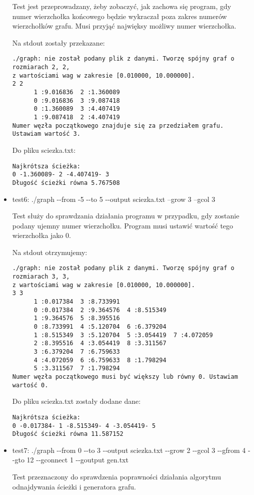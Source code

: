 \documentclass[]{article}
\begin{document}
\begin{itemize}
Test jest przeprowadzany, żeby zobaczyć, jak zachowa się program, gdy numer wierzchołka końcowego będzie wykraczał poza zakres numerów wierzchołków grafu. Musi przyjąć najwięksy możliwy numer wierzchołka.

Na stdout zostały przekazane:
\begin{verbatim}
./graph: nie został podany plik z danymi. Tworzę spójny graf o rozmiarach 2, 2, 
z wartościami wag w zakresie [0.010000, 10.000000].
2 2
	  1 :9.016836  2 :1.360089
	  0 :9.016836  3 :9.087418
	  0 :1.360089  3 :4.407419
	  1 :9.087418  2 :4.407419
Numer węzła początkowego znajduje się za przedziałem grafu. Ustawiam wartość 3.
\end{verbatim}

Do pliku sciezka.txt:
\begin{verbatim}
Najkrótsza ścieżka: 
0 -1.360089- 2 -4.407419- 3
Długość ścieżki równa 5.767508
\end{verbatim}
\item test6: ./graph -{}-from -5 -{}-to 5 -{}-output sciezka.txt --grow 3 --gcol 3

Test służy do sprawdzania działania programu w przypadku, gdy zostanie podany ujemny numer wierzchołku. Program musi ustawić wartość tego wierzchołka jako 0.

Na stdout otrzymujemy:
\begin{verbatim}
./graph: nie został podany plik z danymi. Tworzę spójny graf o rozmiarach 3, 3,
z wartościami wag w zakresie [0.010000, 10.000000].
3 3
	  1 :0.017384  3 :8.733991
	  0 :0.017384  2 :9.364576  4 :8.515349
	  1 :9.364576  5 :8.395516
	  0 :8.733991  4 :5.120704  6 :6.379204
	  1 :8.515349  3 :5.120704  5 :3.054419  7 :4.072059
	  2 :8.395516  4 :3.054419  8 :3.311567
	  3 :6.379204  7 :6.759633
	  4 :4.072059  6 :6.759633  8 :1.798294
	  5 :3.311567  7 :1.798294
Numer węzła początkowego musi być większy lub równy 0. Ustawiam wartość 0.
\end{verbatim}
Do pliku sciezka.txt zostały dodane dane:
\begin{verbatim}
Najkrótsza ścieżka: 
0 -0.017384- 1 -8.515349- 4 -3.054419- 5
Długość ścieżki równa 11.587152
\end{verbatim}
\item test7: ./graph -{}-from 0 -{}-to 3 -{}-output sciezka.txt -{}-grow 2 -{}-gcol 3 -{}-gfrom 4 -{}-gto 12 -{}-gconnect 1 -{}-goutput gen.txt

Test przeznaczony do sprawdzenia poprawności działania algorytmu odnajdywania ścieżki i generatora grafu.


\end{itemize}
\end{document}

